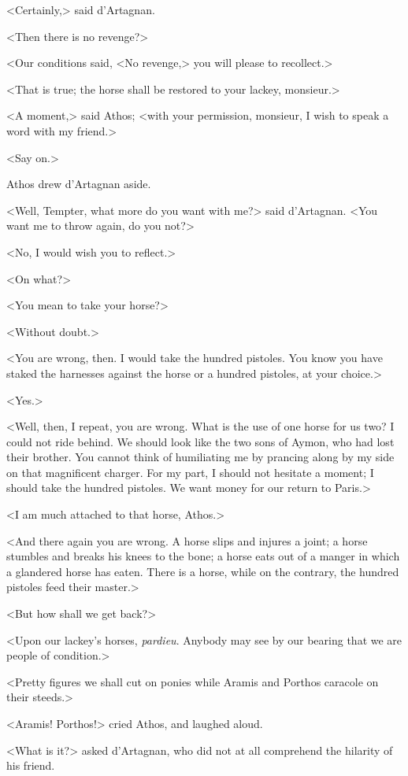 <Certainly,> said d'Artagnan. 

<Then there is no revenge?> 

<Our conditions said, <No revenge,> you will please to recollect.> 

<That is true; the horse shall be restored to your lackey, monsieur.> 

<A moment,> said Athos; <with your permission, monsieur, I wish to speak a word with my friend.> 

<Say on.> 

Athos drew d'Artagnan aside. 

<Well, Tempter, what more do you want with me?> said d'Artagnan. <You want me to throw again, do you not?> 

<No, I would wish you to reflect.> 

<On what?> 

<You mean to take your horse?> 

<Without doubt.> 

<You are wrong, then. I would take the hundred pistoles. You know you have staked the harnesses against the horse or a hundred pistoles, at your choice.> 

<Yes.> 

<Well, then, I repeat, you are wrong. What is the use of one horse for us two? I could not ride behind. We should look like the two sons of Aymon, who had lost their brother. You cannot think of humiliating me by prancing along by my side on that magnificent charger. For my part, I should not hesitate a moment; I should take the hundred pistoles. We want money for our return to Paris.> 

<I am much attached to that horse, Athos.> 

<And there again you are wrong. A horse slips and injures a joint; a horse stumbles and breaks his knees to the bone; a horse eats out of a manger in which a glandered horse has eaten. There is a horse, while on the contrary, the hundred pistoles feed their master.> 

<But how shall we get back?> 

<Upon our lackey's horses, \textit{pardieu}. Anybody may see by our bearing that we are people of condition.> 

<Pretty figures we shall cut on ponies while Aramis and Porthos caracole on their steeds.> 

<Aramis! Porthos!> cried Athos, and laughed aloud. 

<What is it?> asked d'Artagnan, who did not at all comprehend the hilarity of his friend. 

